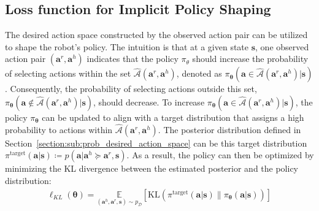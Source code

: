 \subsection{Loss function for Implicit Policy Shaping}
\label{sec:sub:implicit_policy_shaping}



The desired action space constructed by the observed action pair can be utilized to shape the robot's policy. 
The intuition is that at a given state $\bm s$, 
one observed action pair $(\bm a^r, \bm a^h)$ indicates that the policy $\pi_\theta$ should increase the probability of selecting actions within the set $\hat{\mathcal{A}}(\bm{a}^r, \bm{a}^h)$, denoted as $\pi_{\bm \theta}(\bm{a} \in \hat{\mathcal{A}}(\bm{a}^r, \bm{a}^h) | \bm{s})$. Consequently, the probability of selecting actions outside this set, $\pi_{\bm \theta}(\bm{a} \notin \hat{\mathcal{A}}(\bm{a}^r, \bm{a}^h) | \bm{s})$, should decrease.
To increase $\pi_{\bm \theta}(\bm a \in \hat{ \mathcal{A}}{(\bm a^r, \bm a^h)} | \bm s)$, the policy $\pi_{\bm \theta}$ can be updated to align with a target distribution that assigns a high probability to actions within $\hat{ \mathcal{A}}{(\bm a^r, \bm a^h)}$.  The posterior distribution defined in Section~\ref{section:sub:prob_desired_action_space} can be this target distribution $\pi^{\text{target}}(\bm a| \bm s ) \coloneqq p(\bm a|\bm a^h \succeq \bm a^r, \bm s) $. 
As a result, the policy can then be optimized by minimizing the KL divergence between the estimated posterior and the policy distribution:
\begin{align}
    \ell_{KL}(\bm \theta) = \!\! \!\!\underset{(\bm{a}^{h}, \bm{a}^{r}, \bm{s}) \sim p_{\mathcal D}}{\mathbb{E}} \!\!\left[ \mathrm{KL}\left(\pi^{\text{target}}(\bm a| \bm s ) \big\| \pi_{\bm \theta}(\bm a | \bm s) \right) \right] 
    \label{eq:KL_loss_general}
\end{align}


